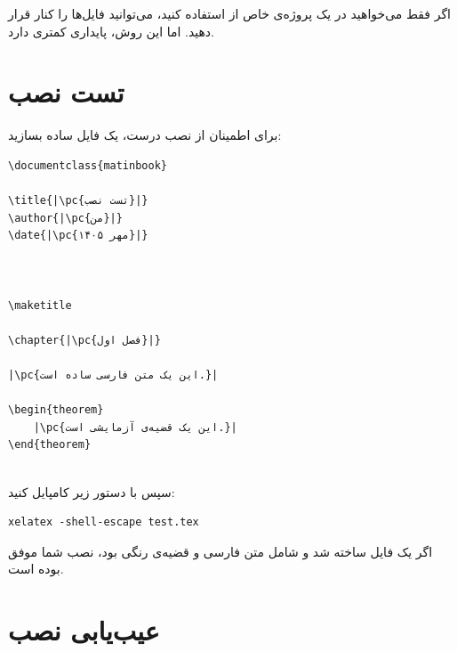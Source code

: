 اگر فقط می‌خواهید در یک پروژه‌ی خاص از
 استفاده کنید، می‌توانید فایل‌ها
را کنار  قرار دهید. اما این
روش، پایداری کمتری دارد.

\section{تست نصب}
\label{sec:installation-test}

برای اطمینان از نصب درست، یک فایل ساده بسازید:

\begin{latin}
\begin{verbatim}
\documentclass{matinbook}

\title{|\pc{تست نصب}|}
\author{|\pc{من}|}
\date{|\pc{مهر ۱۴۰۵}|}



\maketitle

\chapter{|\pc{فصل اول}|}

|\pc{این یک متن فارسی ساده است.}|

\begin{theorem}
    |\pc{این یک قضیه‌ی آزمایشی است.}|
\end{theorem}


\end{verbatim}
\end{latin}


سپس با دستور زیر کامپایل کنید:

\begin{latin}
\begin{verbatim}
xelatex -shell-escape test.tex
\end{verbatim}
\end{latin}

اگر یک فایل  ساخته شد و شامل
متن فارسی و قضیه‌ی رنگی بود، نصب شما موفق
بوده است.

\section{عیب‌یابی نصب}
\label{sec:installation-troubleshooting}

